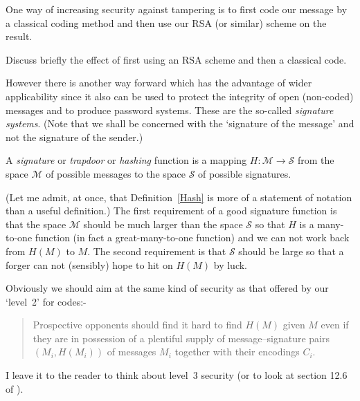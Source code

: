 One way of increasing security against tampering
is to first code our message by a classical coding
method and then use our RSA (or similar) scheme
on the result.
\begin{exercise} Discuss briefly the effect
of first using an RSA scheme and then a classical
code.
\end{exercise}
However there is another way forward which has the
advantage of wider applicability since it
also can be used
to protect the integrity of open (non-coded) messages
and to produce password systems. These are
the so-called \emph{signature systems}.
(Note that we shall be concerned with the
`signature of the message' and not the
signature of the sender.)

\begin{definition}\label{Hash}
A  \emph{signature} or \emph{trapdoor}
or \emph{hashing}
function is a mapping
$H:{\mathcal M}\rightarrow{\mathcal S}$
from the space ${\mathcal M}$ of possible messages
to the space ${\mathcal S}$ of possible signatures.
\end{definition}
\noindent
(Let me admit, at once,
that Definition~\ref{Hash} is more of a statement
of notation than a useful definition.)
The first requirement of a good signature function
is that the space ${\mathcal M}$ should be
much larger than the space ${\mathcal S}$
so that $H$ is a many-to-one function (in fact
a great-many-to-one function) and we can not
work back from $H(M)$ to $M$.  The second requirement
is that ${\mathcal S}$  should be large
so that a forger can not (sensibly) hope
to hit on $H(M)$ by luck.

Obviously we should aim at the same kind of security
as that offered by our `level~2' for codes:-
\begin{quote}
Prospective opponents should find
it hard to find $H(M)$ given $M$ even
if they are in possession of
a plentiful supply of message--signature pairs
$(M_{i},H(M_{i}))$
of messages $M_{i}$ together with their encodings $C_{i}$.
\end{quote}
I leave it to the reader to think about level~3
security (or to look at section 12.6 of \cite{Welsh}).

